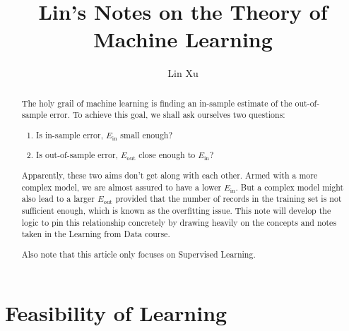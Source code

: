 \documentclass[10pt]{article}
\title{Lin's Notes on the Theory of Machine Learning}
\author{Lin Xu}
\numberwithin{equation}{section}  %
\begin{document}
\maketitle

\vspace{10mm}

\begin{abstract}
The holy grail of machine learning is finding an in-sample estimate of the out-of-sample error. To achieve this goal, we shall ask ourselves two questions:
\begin{enumerate}
    \item Is in-sample error, $E_\mathrm{in}$ small enough?
    \item Is out-of-sample error, $E_\mathrm{out}$ close enough to $E_\mathrm{in}$?
\end{enumerate}

Apparently, these two aims don't get along with each other. Armed with a more complex model, we are almost assured to have a lower $E_\mathrm{in}$. But a complex model might also lead to a larger $E_\mathrm{out}$ provided that the number of records in the training set is not sufficient enough, which is known as the overfitting issue. This note will develop the logic to pin this relationship concretely by drawing heavily on the concepts and notes taken in the Learning from Data course.

Also note that this article only focuses on Supervised Learning.
\end{abstract}


\section{Feasibility of Learning}
\end{document}
